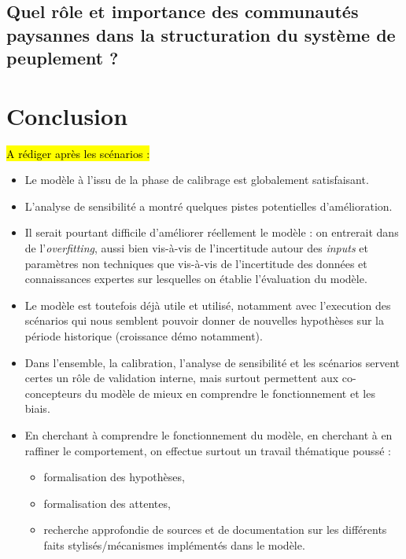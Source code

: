 \subsection{Quel rôle et importance des communautés paysannes dans la structuration du système de peuplement ? \label{subsec:scenario-communautes}}

\section*{Conclusion}

\hl{A rédiger après les scénarios :}
\begin{itemize}
	\item Le modèle à l'issu de la phase de calibrage est globalement satisfaisant.
	\item L'analyse de sensibilité a montré quelques pistes potentielles d'amélioration.
	\item Il serait pourtant difficile d'améliorer réellement le modèle : on entrerait dans de l'\textit{overfitting}, aussi bien vis-à-vis de l'incertitude autour des \textit{inputs} et paramètres non techniques que vis-à-vis de l'incertitude des données et connaissances expertes sur lesquelles on établie l'évaluation du modèle.
	\item Le modèle est toutefois déjà utile et utilisé, notamment avec l'execution des scénarios qui nous semblent pouvoir donner de nouvelles hypothèses sur la période historique (croissance démo notamment).
	\item Dans l'ensemble, la calibration, l'analyse de sensibilité et les scénarios servent certes un rôle de validation interne, mais surtout permettent aux co-concepteurs du modèle de mieux en comprendre le fonctionnement et les biais.
	\item En cherchant à comprendre le fonctionnement du modèle, en cherchant à en raffiner le comportement, on effectue surtout un travail thématique poussé :
	\begin{itemize}
		\item formalisation des hypothèses,
		\item formalisation des attentes,
		\item recherche approfondie de sources et de documentation sur les différents faits stylisés/mécanismes implémentés dans le modèle.
	\end{itemize}
\end{itemize}